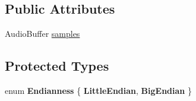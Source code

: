 \subsection*{Public Attributes}
\begin{DoxyCompactItemize}
\item 
Audio\+Buffer \hyperlink{class_audio_file_af937119db095c5af870851050dcbeabb}{samples}
\end{DoxyCompactItemize}
\subsection*{Protected Types}
\begin{DoxyCompactItemize}
\item 
\mbox{\label{class_audio_file_a4d5f3a950f0c059380d268abf39fd67e}} 
enum {\bfseries Endianness} \{ {\bfseries Little\+Endian}, 
{\bfseries Big\+Endian}
 \}
\end{DoxyCompactItemize}
